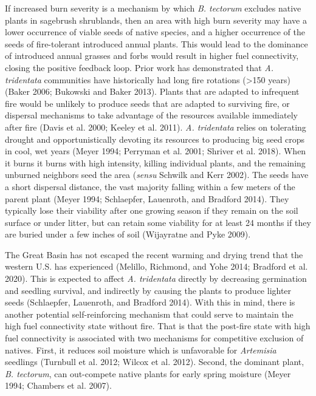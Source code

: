 \documentclass[
  12pt,
]{article}
\begin{document}
If increased burn severity is a mechanism by which \emph{B. tectorum}
excludes native plants in sagebrush shrublands, then an area with high
burn severity may have a lower occurrence of viable seeds of native
species, and a higher occurrence of the seeds of fire-tolerant
introduced annual plants. This would lead to the dominance of introduced
annual grasses and forbs would result in higher fuel connectivity,
closing the positive feedback loop. Prior work has demonstrated that
\emph{A. tridentata} communities have historically had long fire
rotations (\textgreater150 years) (Baker 2006; Bukowski and Baker 2013).
Plants that are adapted to infrequent fire would be unlikely to produce
seeds that are adapted to surviving fire, or dispersal mechanisms to
take advantage of the resources available immediately after fire (Davis
et al. 2000; Keeley et al. 2011). \emph{A. tridentata} relies on
tolerating drought and opportunistically devoting its resources to
producing big seed crops in cool, wet years (Meyer 1994; Perryman et al.
2001; Shriver et al. 2018). When it burns it burns with high intensity,
killing individual plants, and the remaining unburned neighbors seed the
area (\emph{sensu} Schwilk and Kerr 2002). The seeds have a short
dispersal distance, the vast majority falling within a few meters of the
parent plant (Meyer 1994; Schlaepfer, Lauenroth, and Bradford 2014).
They typically lose their viability after one growing season if they
remain on the soil surface or under litter, but can retain some
viability for at least 24 months if they are buried under a few inches
of soil (Wijayratne and Pyke 2009).

The Great Basin has not escaped the recent warming and drying trend that
the western U.S. has experienced (Melillo, Richmond, and Yohe 2014;
Bradford et al. 2020). This is expected to affect \emph{A. tridentata}
directly by decreasing germination and seedling survival, and indirectly
by causing the plants to produce lighter seeds (Schlaepfer, Lauenroth,
and Bradford 2014). With this in mind, there is another potential
self-reinforcing mechanism that could serve to maintain the high fuel
connectivity state without fire. That is that the post-fire state with
high fuel connectivity is associated with two mechanisms for competitive
exclusion of natives. First, it reduces soil moisture which is
unfavorable for \emph{Artemisia} seedlings (Turnbull et al. 2012; Wilcox
et al. 2012). Second, the dominant plant, \emph{B. tectorum}, can
out-compete native plants for early spring moisture (Meyer 1994;
Chambers et al. 2007).
\end{document}

